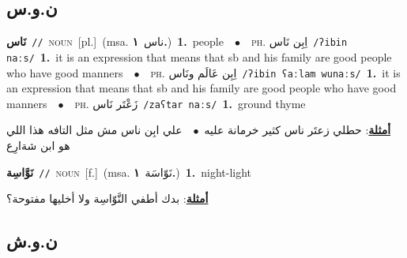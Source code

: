 \documentclass[10pt,a4paper,twoside]{article} %
\begin{document}
\begin{multicols}{2}
\vspace{-3mm}
\subsection*{\color{blue}\foreignlanguage{arabic}{ن.و.س}\color{blue}{}} 

{\setlength\topsep{0pt}\textbf{\foreignlanguage{arabic}{نَاس}}\ {\color{gray}\texttt{//}\color{black}}\ \textsc{noun}\ [pl.]\ \color{gray}(msa. \foreignlanguage{arabic}{ناس}~\foreignlanguage{arabic}{\textbf{١.}})\color{black}\ \textbf{1.}~people\ \ $\bullet$\ \ \textsc{ph.} \color{gray} \foreignlanguage{arabic}{اِبِن نَاس}\color{black}\ {\color{gray}\texttt{/{\sffamily ʔibin naːs}/}\color{black}}\ \textbf{1.}~it is an expression that means that sb and his family are good people who have good manners\ \ $\bullet$\ \ \textsc{ph.} \color{gray} \foreignlanguage{arabic}{اِبِن عَالَم ونَاس}\color{black}\ {\color{gray}\texttt{/{\sffamily ʔibin ʕaːlam wunaːs}/}\color{black}}\ \textbf{1.}~it is an expression that means that sb and his family are good people who have good manners\ \ $\bullet$\ \ \textsc{ph.} \color{gray} \foreignlanguage{arabic}{زَعْتَر نَاس}\color{black}\ {\color{gray}\texttt{/{\sffamily zaʕtar naːs}/}\color{black}}\ \textbf{1.}~ground thyme\  \begin{flushright}\color{gray}\foreignlanguage{arabic}{\textbf{\underline{\foreignlanguage{arabic}{أمثلة}}}: حطلي زعتَر ناس كثير خرمانة عليه\ $\bullet$\ \  علي ابِن ناس مش مثل التافه هذا اللي هو ابن شةارِع}\end{flushright}\color{black}} \vspace{2mm}

{\setlength\topsep{0pt}\textbf{\foreignlanguage{arabic}{نَوَّاسِة}}\ {\color{gray}\texttt{//}\color{black}}\ \textsc{noun}\ [f.]\ \color{gray}(msa. \foreignlanguage{arabic}{نَوّاسَة}~\foreignlanguage{arabic}{\textbf{١.}})\color{black}\ \textbf{1.}~night-light\  \begin{flushright}\color{gray}\foreignlanguage{arabic}{\textbf{\underline{\foreignlanguage{arabic}{أمثلة}}}: بدك أطفي النَّوّاسِة ولا أخليها مفتوحة؟}\end{flushright}\color{black}} \vspace{2mm}

\vspace{-3mm}
\subsection*{\color{blue}\foreignlanguage{arabic}{ن.و.ش}\color{blue}{}} 


\end{multicols}
\end{document}
